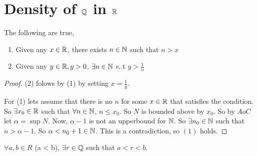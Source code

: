 \section{Density of $\mathbb{Q}$ in $\mathbb{R}$}

\begin{theorem}
    The following are true,
    \begin{enumerate}
        \item Given any $x \in \mathbb{R}$, there exists  $n \in \mathbb{N}$ such that  $n > x$
        \item Given any $y \in \mathbb{R}, y > 0$,  $\exists n \in \mathbb{N}$ s..t  $y > \frac{1}{n}$
    \end{enumerate}
\end{theorem}
\begin{proof}
    (2) folows by (1) by setting $x = \frac{1}{y}$.


    For (1) lets assume that there is no $n$ for some $x \in \mathbb{R}$ that satisfies the condition. So  $\exists x_0 \in \mathbb{R}$ such that $\forall n \in \mathbb{N}$,  $n \le x_0$. So $N$ is bounded above by $x_0$. So by $AoC$ let  $\alpha = \sup N$. Now,  $\alpha - 1$ is not an upperbound for  $\mathbb{N}$. So  $\exists n_0 \in \mathbb{N}$ such that $ n > \alpha - 1$. So  $\alpha < n_0 + 1 \in \mathbb{N}$. This is a contradiction, so $(1)$ holds.
\end{proof}


\begin{theorem}
    $\forall a, b \in R$ (a < b),  $\exists r \in \mathbb{Q}$ such that  $a < r < b$.
\end{theorem}




